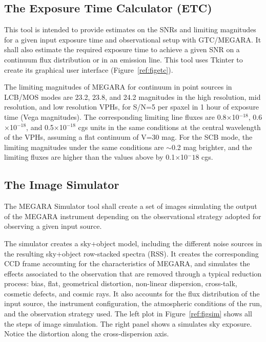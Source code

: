 \subsection{The Exposure Time Calculator (ETC)}

This tool is intended to provide estimates on the SNRs and limiting magnitudes for a given input exposure time and observational setup with GTC/MEGARA. It shall also estimate the required exposure time to achieve a given SNR on a continuum flux distribution or in an emission line. This tool uses Tkinter to create its graphical user interface (Figure~\ref{ref:figetc}).


The limiting magnitudes of MEGARA for continuum in point sources in LCB/MOS modes are 23.2, 23.8, and 24.2 magnitudes in the high resolution, mid resolution, and low resolution VPHs, for S/N=5 per spaxel in 1 hour of exposure time (Vega magnitudes). The corresponding limiting line fluxes are 0.8$\times$10$^{-18}$, 0.6$\times$10$^{-18}$, and 0.5$\times$10$^{-18}$ cgs units in the same conditions at the central wavelength of the VPHs, assuming a flat continuum of V=30 mag. For the SCB mode, the limiting magnitudes under the same conditions are $\sim$0.2 mag brighter, and the limiting fluxes are higher than the values above by 0.1$\times$10$^-18$ cgs.

\subsection{The Image Simulator}

The MEGARA Simulator tool shall create a set of images simulating the output of the MEGARA instrument depending on the observational strategy adopted for observing a given input source. 

The simulator creates a sky+object model, including the different noise sources in the resulting sky+object row-stacked spectra (RSS). It creates the corresponding CCD frame accounting for the characteristics of MEGARA, and simulates the effects associated to the observation that are removed through a typical reduction process: bias, flat, geometrical distortion, non-linear  dispersion, cross-talk, cosmetic defects, and cosmic rays. It also accounts for the flux distribution of the input source, the instrument configuration, the atmospheric conditions of the run, and the observation strategy used. The left plot in Figure~\ref{ref:figsim} shows all the steps of image simulation. The right panel shows a simulates sky exposure. Notice the
distortion along the cross-dispersion axis.

